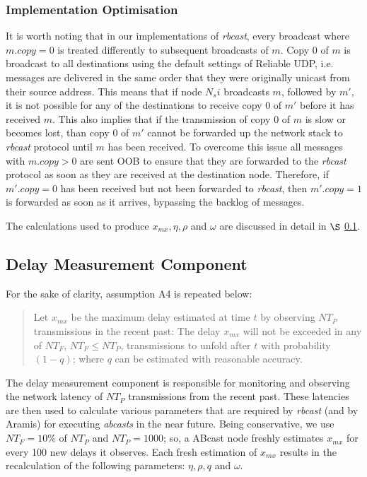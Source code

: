     \subsubsection*{Implementation Optimisation}
    It is worth noting that in our implementations of \emph{rbcast}, every broadcast where $m.copy = 0$ is treated differently to subsequent broadcasts of $m$.  Copy 0 of $m$ is broadcast to all destinations using the default settings of Reliable UDP, i.e. messages are delivered in the same order that they were originally unicast from their source address.  This means that if node $N_si$ broadcasts $m$, followed by $m'$, it is not possible for any of the destinations to receive copy $0$ of $m'$ before it has received $m$.  This also implies that if the transmission of copy $0$ of $m$ is slow or becomes lost, than copy $0$ of $m'$ cannot be forwarded up the network stack to \emph{rbcast} protocol until $m$ has been received.  To overcome this issue all messages with $m.copy > 0$ are sent OOB to ensure that they are forwarded to the \emph{rbcast} protocol as soon as they are received at the destination node.  Therefore, if $m'.copy = 0$ has been received but not been forwarded to \emph{rbcast}, then $m'.copy = 1$ is forwarded as soon as it arrives, bypassing the backlog of messages.  
    
    The calculations used to produce $x_{mx}, \eta, \rho$ and $\omega$ are discussed in detail in $\S$ \ref{ssec:dmc}.  
    
    \subsection{Delay Measurement Component}\label{ssec:dmc}
        For the sake of clarity, assumption A4 is repeated below:   
        
        \begin{quotation}
            Let $x_{mx}$ be the maximum delay estimated at time $t$ by observing $NT_P$ transmissions in the recent past: The delay $x_{mx}$ will not be exceeded in any of $NT_F$, $NT_F \leq NT_P$, transmissions to unfold after $t$ with probability $(1 - q)$; where $q$ can be estimated with reasonable accuracy.  
        \end{quotation}
    
        The delay measurement component is responsible for monitoring and observing the network latency of $NT_P$ transmissions from the recent past.  These latencies are then used to calculate various parameters that are required by \emph{rbcast} (and by \textsf{Aramis}) for executing \emph{abcasts} in the near future.  Being conservative, we use $NT_F = 10\%$ of $NT_P$ and $NT_P=1000$; so, a \textsf{ABcast} node freshly estimates $x_{mx}$ for every 100 new delays it observes.  Each fresh estimation of $x_{mx}$ results in the recalculation of the following parameters: $\eta, \rho, q$ and $\omega$.  
        
